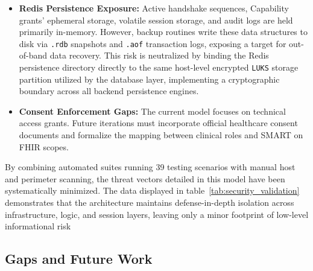 \begin{itemize}
    \item \textbf{Redis Persistence Exposure:} Active handshake sequences, Capability grants' ephemeral storage, volatile session storage, and audit logs are held primarily in-memory. 
    However, backup routines write these data structures to disk via \texttt{.rdb} snapshots and \texttt{.aof} transaction logs, 
    exposing a target for out-of-band data recovery. This risk is neutralized by binding the Redis persistence directory directly to the same host-level encrypted \texttt{LUKS} storage partition utilized by the database layer, implementing a cryptographic boundary across all backend persistence engines.
    \item \textbf{Consent Enforcement Gaps:} The current model focuses on technical access grants. Future iterations must incorporate official healthcare consent documents and formalize the mapping between clinical roles and \ac{SMART} on FHIR scopes.
\end{itemize}


By combining automated suites running 39 testing scenarios with manual host and perimeter scanning, the threat vectors detailed in this model have been systematically minimized. 
The data displayed in table~\ref{tab:security_validation} demonstrates that the architecture maintains defense-in-depth isolation across infrastructure, logic, and session layers, leaving only a minor footprint of low-level informational risk

\subsection{Gaps and Future Work}

